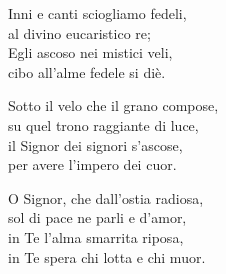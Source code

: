 
\strofa Inni e canti sciogliamo fedeli,\\
al divino eucaristico re;\\
Egli ascoso nei mistici veli,\\
cibo all'alme fedele si diè.

\spazio

 

\spazio

\strofa Sotto il velo che il grano compose,\\
su  quel trono raggiante di luce,\\
il Signor dei signori s'ascose,\\
per avere l'impero dei cuor.

\spazio


\spazio

\strofa O Signor, che dall'ostia radiosa,\\
sol di pace ne parli e d'amor,\\
in Te l'alma smarrita riposa,\\
in Te spera chi lotta e chi muor.

\spazio

